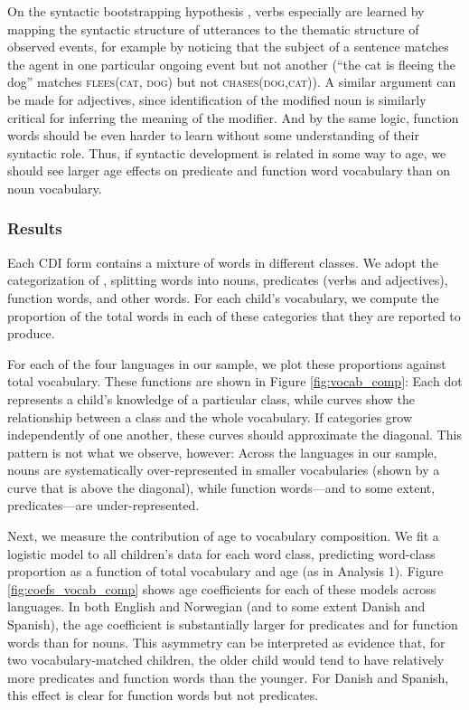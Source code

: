 \documentclass[10pt,letterpaper]{article}
\begin{document}
On the syntactic bootstrapping hypothesis \cite{gleitman1990,fisher2010}, verbs especially are learned by mapping the syntactic structure of utterances to the thematic structure of observed events, for example by noticing that the subject of a sentence matches the agent in one particular ongoing event but not another (``the cat is fleeing the dog'' matches \textsc{flees(cat, dog)} but not \textsc{chases(dog,cat)}). A similar argument can be made for adjectives, since identification of the modified noun is similarly critical for inferring the meaning of the modifier. And by the same logic, function words should be even harder to learn without some understanding of their syntactic role. Thus, if syntactic development is related in some way to age, we should see larger age effects on predicate and function word vocabulary than on noun vocabulary. 

\subsubsection{Results}

Each CDI form contains a mixture of words in different classes. We adopt the categorization of , splitting words into nouns, predicates (verbs and adjectives), function words, and other words. For each child's vocabulary, we compute the proportion of the total words in each of these categories that they are reported to produce.

For each of the four languages in our sample, we plot these proportions against total vocabulary. These functions are shown in Figure \ref{fig:vocab_comp}: Each dot represents a child's knowledge of a particular class, while curves show the relationship between a class and the whole vocabulary. If categories grow independently of one another, these curves should approximate the diagonal. This pattern is not what we observe, however: Across the languages in our sample, nouns are systematically over-represented in smaller vocabularies (shown by a curve that is above the diagonal), while function words---and to some extent, predicates---are under-represented. 

Next, we measure the contribution of age to vocabulary composition. We fit a logistic model to all children's data for each word class, predicting word-class proportion as a function of total vocabulary and age (as in Analysis 1). Figure \ref{fig:coefs_vocab_comp} shows age coefficients for each of these models across languages. In both English and Norwegian (and to some extent Danish and Spanish), the age coefficient is substantially larger for predicates and for function words than for nouns. This asymmetry can be interpreted as evidence that, for two vocabulary-matched children, the older child would tend to have relatively more predicates and function words than the younger. For Danish and Spanish, this effect is clear for function words but not predicates.
\end{document}
